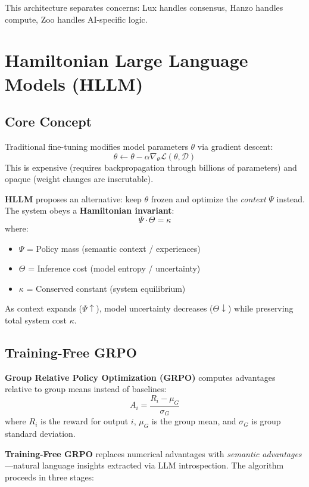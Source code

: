 \documentclass[11pt,a4paper]{article}
\begin{document}
This architecture separates concerns: Lux handles consensus, Hanzo handles compute, Zoo handles AI-specific logic.

\section{Hamiltonian Large Language Models (HLLM)}

\subsection{Core Concept}

Traditional fine-tuning modifies model parameters $\theta$ via gradient descent:
\[
\theta \leftarrow \theta - \alpha \nabla_\theta \mathcal{L}(\theta, \mathcal{D})
\]
This is expensive (requires backpropagation through billions of parameters) and opaque (weight changes are inscrutable).

\textbf{HLLM} \cite{zoo2025hllm} proposes an alternative: keep $\theta$ frozen and optimize the \textit{context} $\Psi$ instead. The system obeys a \textbf{Hamiltonian invariant}:
\[
\Psi \cdot \Theta = \kappa
\]
where:
\begin{itemize}
\item $\Psi$ = Policy mass (semantic context / experiences)
\item $\Theta$ = Inference cost (model entropy / uncertainty)
\item $\kappa$ = Conserved constant (system equilibrium)
\end{itemize}

As context expands ($\Psi \uparrow$), model uncertainty decreases ($\Theta \downarrow$) while preserving total system cost $\kappa$.

\subsection{Training-Free GRPO}

\textbf{Group Relative Policy Optimization (GRPO)} \cite{shao2024deepseekmath} computes advantages relative to group means instead of baselines:
\[
A_i = \frac{R_i - \mu_G}{\sigma_G}
\]
where $R_i$ is the reward for output $i$, $\mu_G$ is the group mean, and $\sigma_G$ is group standard deviation.

\textbf{Training-Free GRPO} \cite{tencent2025grpo} replaces numerical advantages with \textit{semantic advantages}—natural language insights extracted via LLM introspection. The algorithm proceeds in three stages:
\end{document}
